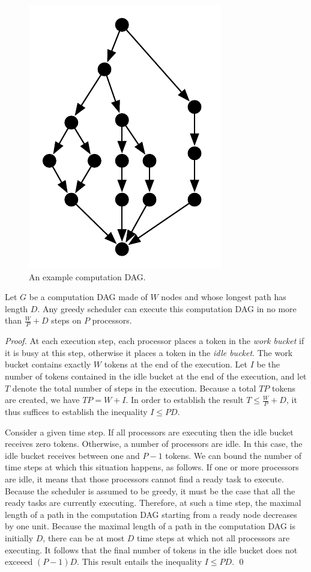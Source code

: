  

\begin{figure}
\centering
\ifx\arthur\false
\includegraphics[width=0.4\columnwidth]{pictures/computation-dag}
\fi
\caption{An example computation DAG.}
\label{fig:dag}
\end{figure}



\begin{theorem}
\label{thm:basic-brent}
Let $G$ be a computation DAG made of $W$ nodes and whose
longest path has length $D$.
Any greedy scheduler can 
execute this computation DAG in no more than $\frac{W}{P} + D$ 
steps on $P$ processors. 
\end{theorem}
\begin{proof}
At each execution step, each processor places a token in the {\em work bucket}
if it is busy at this step, otherwise it places a token in the {\em idle bucket}.
The work bucket contains exactly $W$ tokens at the end of the execution.
Let $I$ be the number of tokens contained in the idle bucket at the end of the
execution, and let $T$ denote the total number of steps in the execution.
Because a total $T P$ tokens are created, we have $T P = W + I$.
In order to establish the result $T \leq \frac{W}{P} + D$,
it thus suffices to establish the inequality $I \leq P D$.

Consider a given time step.
If all processors are executing then the idle bucket
receives zero tokens. Otherwise, a number of processors are idle.
In this case, the idle bucket receives between one and $P-1$ tokens.
We can bound the number of time steps at which this situation happens,
as follows. 
If one or more processors are idle, it means that those processors cannot
find a ready task to execute. Because the scheduler is assumed to be greedy,
it must be the case that all the ready tasks are currently executing.
Therefore, at such a time step, the maximal length of a path 
in the computation DAG starting from a ready node decreases by one unit. 
Because the maximal length of a path in the computation DAG is initially $D$,
there can be at most $D$ time steps at which not all processors are executing.
It follows that the final number of tokens in the idle bucket
does not exceeed $(P-1) D$. This result entails the inequality $I \leq P D$. \qed
\end{proof}

